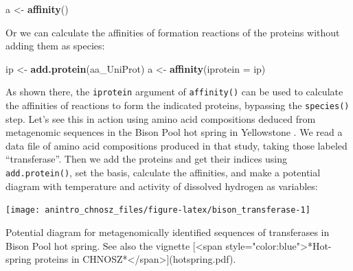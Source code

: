 \documentclass[]{tufte-book}
\newenvironment{Shaded}{}{}
\newcommand{\KeywordTok}[1]{\textcolor[rgb]{0.00,0.44,0.13}{\textbf{#1}}}
\newcommand{\DataTypeTok}[1]{\textcolor[rgb]{0.56,0.13,0.00}{#1}}
\newcommand{\StringTok}[1]{\textcolor[rgb]{0.25,0.44,0.63}{#1}}
\newcommand{\NormalTok}[1]{#1}
\begin{document}
\begin{Shaded}
\begin{Highlighting}[]
\NormalTok{a <-}\StringTok{ }\KeywordTok{affinity}\NormalTok{()}
\end{Highlighting}
\end{Shaded}

Or we can calculate the affinities of formation reactions of the
proteins without adding them as species:

\begin{Shaded}
\begin{Highlighting}[]
\NormalTok{ip <-}\StringTok{ }\KeywordTok{add.protein}\NormalTok{(aa_UniProt)}
\NormalTok{a <-}\StringTok{ }\KeywordTok{affinity}\NormalTok{(}\DataTypeTok{iprotein =}\NormalTok{ ip)}
\end{Highlighting}
\end{Shaded}

As shown there, the \texttt{iprotein} argument of {\texttt{affinity()}}
can be used to calculate the affinities of reactions to form the
indicated proteins, bypassing the {\texttt{species()}} step. Let's see
this in action using amino acid compositions deduced from metagenomic
sequences in the Bison Pool hot spring in Yellowstone \citep{DS11}. We
read a data file of amino acid compositions produced in that study,
taking those labeled ``transferase''. Then we add the proteins and get
their indices using {\texttt{add.protein()}}, set the basis, calculate
the affinities, and make a potential diagram with temperature and
activity of dissolved hydrogen as variables:

\begin{marginfigure}
\texttt{[image: anintro\_chnosz\_files/figure-latex/bison\_transferase-1]} \caption[Potential diagram for metagenomically identified sequences of transferases in Bison Pool hot spring]{Potential diagram for metagenomically identified sequences of transferases in Bison Pool hot spring. See also the vignette [<span style="color:blue">*Hot-spring proteins in CHNOSZ*</span>](hotspring.pdf).}\label{fig:bison_transferase}
\end{marginfigure}
\end{document}
